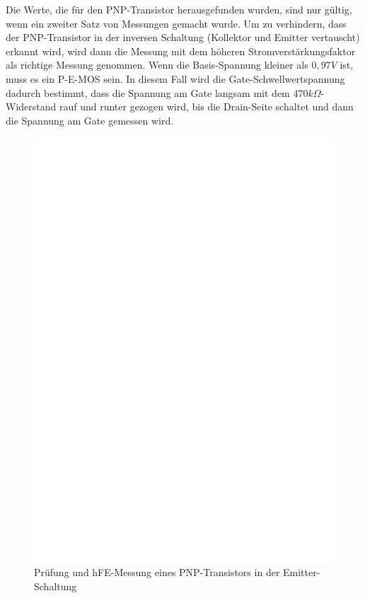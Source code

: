 Die Werte, die für den PNP-Transistor herausgefunden wurden, sind nur gültig, wenn ein zweiter Satz
von Messungen gemacht wurde.
Um zu verhindern, dass der PNP-Transistor in der inversen Schaltung (Kollektor und Emitter vertauscht) erkannt
wird, wird dann die Messung mit dem höheren Stromverstärkungsfaktor als richtige Messung genommen.
Wenn die Basis-Spannung kleiner als \(0,97V\) ist, muss es ein P-E-MOS sein.
In diesem Fall wird die Gate-Schwellwertspannung dadurch bestimmt, dass die Spannung am Gate langsam mit dem
 \(470k\Omega\)-Widerstand rauf und runter gezogen wird, bis die Drain-Seite schaltet und dann
die Spannung am Gate gemessen wird.

\begin{figure}[H]
\centering
\includegraphics[]{../FIG/PNPce.eps}
\caption{Prüfung und hFE-Messung eines PNP-Transistors in der Emitter-Schaltung}
\label{fig:pnpce}
\end{figure}

